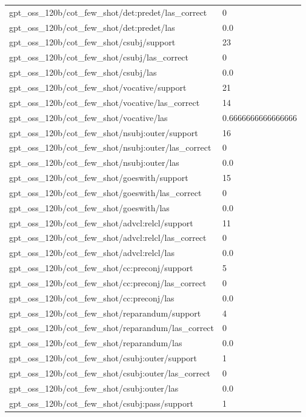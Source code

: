 \begin{tabular}{ll}
gpt\_oss\_120b/cot\_few\_shot/det:predet/las\_correct & 0 \\
gpt\_oss\_120b/cot\_few\_shot/det:predet/las & 0.0 \\
gpt\_oss\_120b/cot\_few\_shot/csubj/support & 23 \\
gpt\_oss\_120b/cot\_few\_shot/csubj/las\_correct & 0 \\
gpt\_oss\_120b/cot\_few\_shot/csubj/las & 0.0 \\
gpt\_oss\_120b/cot\_few\_shot/vocative/support & 21 \\
gpt\_oss\_120b/cot\_few\_shot/vocative/las\_correct & 14 \\
gpt\_oss\_120b/cot\_few\_shot/vocative/las & 0.6666666666666666 \\
gpt\_oss\_120b/cot\_few\_shot/nsubj:outer/support & 16 \\
gpt\_oss\_120b/cot\_few\_shot/nsubj:outer/las\_correct & 0 \\
gpt\_oss\_120b/cot\_few\_shot/nsubj:outer/las & 0.0 \\
gpt\_oss\_120b/cot\_few\_shot/goeswith/support & 15 \\
gpt\_oss\_120b/cot\_few\_shot/goeswith/las\_correct & 0 \\
gpt\_oss\_120b/cot\_few\_shot/goeswith/las & 0.0 \\
gpt\_oss\_120b/cot\_few\_shot/advcl:relcl/support & 11 \\
gpt\_oss\_120b/cot\_few\_shot/advcl:relcl/las\_correct & 0 \\
gpt\_oss\_120b/cot\_few\_shot/advcl:relcl/las & 0.0 \\
gpt\_oss\_120b/cot\_few\_shot/cc:preconj/support & 5 \\
gpt\_oss\_120b/cot\_few\_shot/cc:preconj/las\_correct & 0 \\
gpt\_oss\_120b/cot\_few\_shot/cc:preconj/las & 0.0 \\
gpt\_oss\_120b/cot\_few\_shot/reparandum/support & 4 \\
gpt\_oss\_120b/cot\_few\_shot/reparandum/las\_correct & 0 \\
gpt\_oss\_120b/cot\_few\_shot/reparandum/las & 0.0 \\
gpt\_oss\_120b/cot\_few\_shot/csubj:outer/support & 1 \\
gpt\_oss\_120b/cot\_few\_shot/csubj:outer/las\_correct & 0 \\
gpt\_oss\_120b/cot\_few\_shot/csubj:outer/las & 0.0 \\
gpt\_oss\_120b/cot\_few\_shot/csubj:pass/support & 1 \\

\end{tabular}
